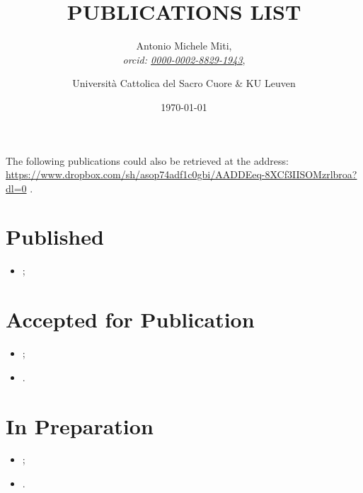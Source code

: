 \documentclass{article}
\title{PUBLICATIONS LIST}
\date{\today}
\author{
	Antonio Michele Miti,\\
	\emph{orcid: \href{https://orcid.org/0000-0002-8829-1943}{0000-0002-8829-1943}},
	\and 
	Università Cattolica del Sacro Cuore \& KU Leuven
}
\begin{document}
  

	\maketitle

  The following publications could also be retrieved at the address: 
  \url{https://www.dropbox.com/sh/asop74adf1c0gbi/AADDEeq-8XCf3IISOMzrlbroa?dl=0}
  .


  \section*{Published}
	  \begin{itemize}
 	   \item {};
	  \end{itemize}

  \section*{Accepted for Publication}
	  \begin{itemize}
 	   \item {};
 	   \item {}.
	  \end{itemize}


  
  \section*{In Preparation}
	  \begin{itemize}
 	   \item {};
 	   \item {}.
	  \end{itemize}

  
\end{document}
